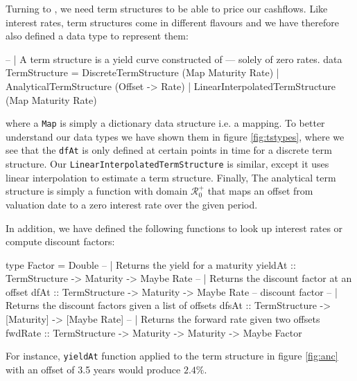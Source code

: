 Turning to \hql, we need term structures to be able to price our cashflows.
Like interest rates, term structures come in different flavours and we 
have therefore also defined a data type to represent them:

\begin{hscode}
-- | A term structure is a yield curve constructed of
--- solely of zero rates.
data TermStructure = DiscreteTermStructure (Map Maturity Rate)
                   | AnalyticalTermStructure (Offset -> Rate)
                   | LinearInterpolatedTermStructure (Map Maturity Rate)
\end{hscode}

where a \texttt{Map} is simply a dictionary data structure i.e. a mapping.
To better understand our data types we have shown them in figure \ref{fig:tstypes},
where we see that the \texttt{dfAt} is only defined at certain points in time for
a discrete term structure. Our \texttt{LinearInterpolatedTermStructure} is similar,
except it uses linear interpolation to estimate a term structure.
Finally, The analytical term structure is simply a function with domain $\mathcal{R}^+_0$
that maps an offset from valuation date to a zero interest rate over the given
period.

In addition, we have defined the following functions to look up interest rates
or compute discount factors:

\begin{hscode}
type Factor = Double
-- | Returns the yield for a maturity
yieldAt :: TermStructure -> Maturity -> Maybe Rate
-- | Returns the discount factor at an offset
dfAt :: TermStructure -> Maturity -> Maybe Rate -- discount factor
-- | Returns the discount factors given a list of offsets
dfsAt :: TermStructure -> [Maturity] -> [Maybe Rate]
-- | Returns the forward rate given two offsets
fwdRate :: TermStructure -> Maturity -> Maturity -> Maybe Factor
\end{hscode}

For instance, \texttt{yieldAt} function applied to the term structure in
figure \ref{fig:anc} with an offset of 3.5 years would produce $2.4\%$.

